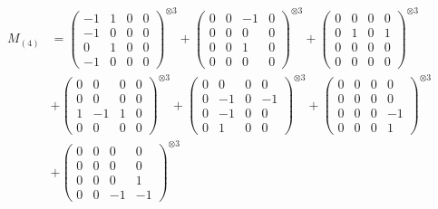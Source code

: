 \documentclass{article}
\newcommand{\Mthree}{%
    M_{(4)}
}
\begin{document}
        \newpage
        
        \footnotesize{
        \begin{align}
        \Mthree
        &= \label{Rs16-Rc11-Solution-6-c1} \begin{pmatrix} -1 & 1 & 0 & 0 \\ -1 & 0 & 0 & 0 \\ 0 & 1 & 0 & 0 \\ -1 & 0 & 0 & 0 \end{pmatrix}^{\otimes 3} 
            + \begin{pmatrix} 0 & 0 & -1 & 0 \\ 0 & 0 & 0 & 0 \\ 0 & 0 & 1 & 0 \\ 0 & 0 & 0 & 0 \end{pmatrix}^{\otimes 3} 
            + \begin{pmatrix} 0 & 0 & 0 & 0 \\ 0 & 1 & 0 & 1 \\ 0 & 0 & 0 & 0 \\ 0 & 0 & 0 & 0 \end{pmatrix}^{\otimes 3} \\
        &+ \label{Rs16-Rc11-Solution-6-c4} \begin{pmatrix} 0 & 0 & 0 & 0 \\ 0 & 0 & 0 & 0 \\ 1 & -1 & 1 & 0 \\ 0 & 0 & 0 & 0 \end{pmatrix}^{\otimes 3} 
            + \begin{pmatrix} 0 & 0 & 0 & 0 \\ 0 & -1 & 0 & -1 \\ 0 & -1 & 0 & 0 \\ 0 & 1 & 0 & 0 \end{pmatrix}^{\otimes 3} 
            + \begin{pmatrix} 0 & 0 & 0 & 0 \\ 0 & 0 & 0 & 0 \\ 0 & 0 & 0 & -1 \\ 0 & 0 & 0 & 1 \end{pmatrix}^{\otimes 3} \\
        &+ \label{Rs16-Rc11-Solution-6-c7} \begin{pmatrix} 0 & 0 & 0 & 0 \\ 0 & 0 & 0 & 0 \\ 0 & 0 & 0 & 1 \\ 0 & 0 & -1 & -1 \end{pmatrix}^{\otimes 3} 

\end{align}}
\end{document}
